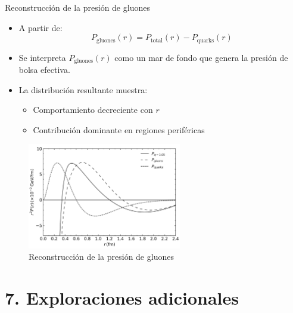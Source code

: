 \documentclass{beamer}
\begin{document}
\begin{frame}{Reconstrucción de la presión de gluones}
  \begin{itemize}
    \item A partir de:
    \[
      P_{\text{gluones}}(r) = P_{\text{total}}(r) - P_{\text{quarks}}(r)
    \]
    \item Se interpreta \( P_{\text{gluones}}(r) \) como un mar de fondo que genera la presión de bolsa efectiva.
    \item La distribución resultante muestra:
    \begin{itemize}
      \item Comportamiento decreciente con \( r \)
      \item Contribución dominante en regiones periféricas
    \end{itemize}
  \end{itemize}
  \centering
  \begin{figure}
    \includegraphics[width=0.6\textwidth]{figures/Pressure_gluons_reconstructed.png} %
    \caption{Reconstrucción de la presión de gluones}
  \end{figure}
\end{frame}

\section[Exploraciones adicionales]{7. Exploraciones adicionales}
\end{document}
